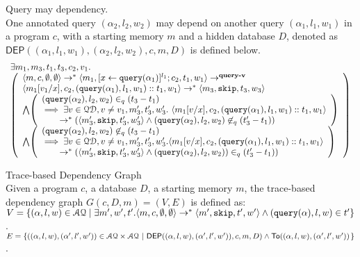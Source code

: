 \documentclass[a4paper,11pt]{article}
\begin{document}
\begin{defn}
Query may dependency.
\label{def:query_dep}
\\
{
One annotated query $({\alpha}_2,l_2, w_2)$ may depend on another query $({\alpha}_1, l_1, w_1)$ in a program $c$,
with a starting memory $m$ and a hidden database $D$, denoted as 
%
$\mathsf{DEP}({(\alpha_1, l_1, w_1)}, ({\alpha}_2, l_2, w_2), c, m, D)$ is defined below. 
}
{
\[
\begin{array}{l}
\exists m_1,m_3,t_1,t_3,c_2,v_1.\\
  \left (\begin{array}{l}   
\config{m, c, \emptyset ,\emptyset} \rightarrow^{*} 
\config{m_1, [\assign{x}{\query({\alpha}_1)}]^{l_1} ; c_2,
  t_1, w_1} 
\rightarrow^{\textbf{query-v}} 
\\ 
\config{m_1[v_1/x], c_2,
(\query({\alpha}_1),l_1, w_1)::t_1, w_1} \rightarrow^{*} \config{m_3, \eskip,
t_3,w_3}
 \\ 
 \bigwedge
  \left( 
  \begin{array}{l}
  (\query({\alpha}_2),l_2,w_2) \in_{q} (t_3-t_1) 
  \\
  \implies 
  \exists v \in \qdom, v \neq v_1, m_3', t_3', w_3'. ~  
  \config{m_1[v/x], {c_2}, (\query({\alpha}_1),l_1, w_1)::t_1, w_1} 
  \\ 
  \quad \quad 
  \rightarrow^{*}
  (\config{m_3', \eskip, t_3', w_3'} 
  \land 
  (\query({\alpha}_2),l_2,w_2) \not \in_{q} (t_3'-t_1))
\end{array} \right )
\\
\bigwedge
\left( 
  \begin{array}{l}
	(\query({\qval}_2),l_2,w_2) \not\in_{q} (t_3-t_1)
  	\\
  	\implies 
	\exists v \in \qdom, v \neq v_1, m_3', t_3', w_3'. 
	\config{m_1[v/x], {c_2}, (\query({\qval}_1),l_1,w_1)::t_1, w_1}
	\\ 
	\quad \quad 
	\rightarrow^{*} 
	(\config{m_3', \eskip, t_3', w_3'} 
	\land 
	(\query({\qval}_2),l_2,w_2))  \in_{q} (t_3'-t_1))
\end{array} \right )
\end{array} \right )
\end{array}
\]
}
\end{defn}
%
%
\begin{defn}
\label{def:trace-based_graph}
Trace-based Dependency Graph
\\
 {
Given a program $c$, a database $D$, a starting memory $m$, the trace-based dependency graph $G(c,D,m) = (V, E)$ is defined as: 
\\
$V =\{({\alpha}, l,w) \in \mathcal{AQ} \mid 
\exists m',  w', t'.  
\langle m ,c, \emptyset, \emptyset \rangle  
\to^{*}  
\langle m' , \mathtt{skip}, t', w'  \rangle  
\land ({\tt query}({\alpha}), l, w) \in t'  \}$.
\\
$E = \left\{(({\qval},l,w),({\qval}',l',w')) \in \mathcal{AQ} \times \mathcal{AQ} 
~ \left \vert ~  
\mathsf{DEP}(({\qval},l,w), ({\qval}',l',w')),c,m,D)
\land 
\mathsf{To}(({\qval},l,w), ({\qval}',l',w'))
 \right.\right\}$.
 }
\end{defn}
\end{document}
